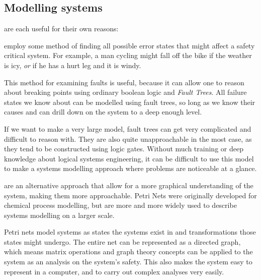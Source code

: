 \documentclass{tufte-handout}
\begin{document}
\subsection{Modelling systems}
are each useful for their own reasons: \par
{}employ some method of finding all possible error states that might affect a safety critical system. For example, a man cycling might fall off the bike if the weather is icy, \emph{or} if he has a hurt leg and it is windy. \par
This method for examining faults is useful, because it can allow one to reason about breaking points using ordinary boolean logic and \emph{Fault Trees}. All failure states we know about can be modelled using fault trees, so long as we know their causes and can drill down on the system to a deep enough level. \par
If we want to make a very large model, fault trees can get very complicated and difficult to reason with. They are also quite unapproachable in the most case, as they tend to be constructed using logic gates. Without much training or deep knowledge about logical systems engineering, it can be difficult to use this model to make a systems modelling approach where problems are noticeable at a glance. \par
{}are an alternative approach that allow for a more graphical understanding of the system, making them more approachable. Petri Nets were originally developed for chemical process modelling, but are more and more widely used to describe systems modelling on a larger scale. \par
Petri nets model systems as states the systems exist in and transformations those states might undergo. The entire net can be represented as a directed graph, which means matrix operations and graph theory concepts can be applied to the system as an analysis on the system's safety. This also makes the system easy to represent in a computer, and to carry out complex analyses very easily. \par
\end{document}
